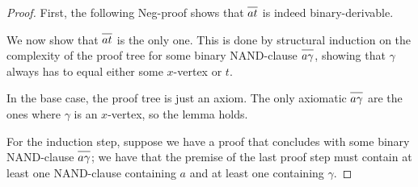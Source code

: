 \begin{proof}
First, the following Neg-proof shows that $\ol{at}$ is indeed binary-derivable.
\begin{figure}[!h]
  \centering
  \begin{prooftree*}[separation=0.8em, rule margin=1ex]
  \end{prooftree*}
  \caption{}
  \label{fig:at_binary_proof}
\end{figure}
\FloatBarrier
We now show that $\ol{at}$ is the only one.
This is done by structural induction on the complexity of the proof tree for some binary NAND-clause $\ol{a\gamma}$, showing that $\gamma$ always has to equal either some $x$-vertex or $t$.

In the base case, the proof tree is just an axiom.
The only axiomatic $\ol{a\gamma}$ are the ones where $\gamma$ is an $x$-vertex, so the lemma holds.

For the induction step, suppose we have a proof that concludes with some binary NAND-clause $\ol{a\gamma}$;
we have that the premise of the last proof step must contain at least one NAND-clause containing $a$ and at least one containing $\gamma$.


\end{proof}
